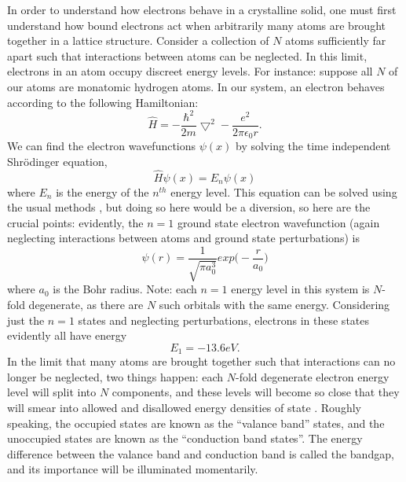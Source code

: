\indent In order to understand how electrons behave in a crystalline solid, one must first understand how bound electrons act when arbitrarily many atoms are brought together in a lattice structure. Consider a collection of $N$ atoms sufficiently far apart such that interactions between atoms can be neglected. In this limit, electrons in an atom occupy discreet energy levels. For instance: suppose all $N$ of our atoms are monatomic hydrogen atoms. In our system, an electron behaves according to the following Hamiltonian:
\begin{equation}
\hat{H} = -\frac{\hbar^2}{2m} \bigtriangledown^2 - \frac{e^2}{2\pi \epsilon_0 r}.
\end{equation}
We can find the electron wavefunctions $\psi(x)$ by solving the time independent Shr\"{o}dinger equation,
\begin{equation}
\hat{H}\psi(x) = E_n\psi(x)
\end{equation}
where $E_n$ is the energy of the $n^{th}$ energy level. This equation can be solved using the usual methods \cite{griffiths}, but doing so here would be a diversion, so here are the crucial points: evidently, the $n=1$ ground state electron wavefunction (again neglecting interactions between atoms and ground state perturbations) is
\begin{equation}
\psi(r) = \frac{1}{\sqrt{\pi a_{0}^{3}}}exp\big (-\frac{r}{a_{0}}\big)
\end{equation}
where $a_0$ is the Bohr radius. Note: each $n = 1$ energy level in this system is $N$-fold degenerate, as there are $N$ such orbitals with the same energy. Considering just the $n = 1$ states and neglecting perturbations, electrons in these states evidently all have energy
\begin{equation}
E_1 = -13.6eV.
\end{equation}
In the limit that many atoms are brought together such that interactions can no longer be neglected, two things happen: each $N$-fold degenerate electron energy level will split into $N$ components, and these levels will become so close that they will smear into allowed and disallowed energy densities of state \cite{iadonisi, sirdesh, griffiths, davies, fox}. Roughly speaking, the occupied states are known as the ``valance band'' states, and the unoccupied states are known as the ``conduction band states''. The energy difference between the valance band and conduction band is called the bandgap, and its importance will be illuminated momentarily. 

